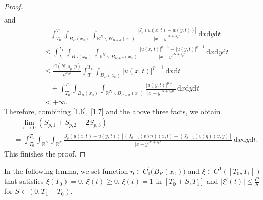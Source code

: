 \documentclass[reqno,10pt]{amsart}
\numberwithin{equation}{section}
\begin{document}
\begin{proof}
\begin{align*}
	\end{align*}
	and
	\begin{align*}
		&\quad\int_{T_0}^{T_1}\int_{B_R(x_0)}\int_{\mathbb{R}^N\backslash B_{R+d}(x_0)}\frac{\left| J_p\left(u(x,t)-u(y,t)\right)\right| }{|x-y|^{N+s_pp}}\,\mathrm{d}x\mathrm{d}y\mathrm{d}t\\
		&\le\int_{T_0}^{T_1}\int_{B_R(x_0)}\int_{\mathbb{R}^N\backslash B_{R+d}(x_0)}\frac{|u(x,t)|^{p-1}+|u(y,t)|^{p-1}}{|x-y|^{N+s_pp}}\,\mathrm{d}x\mathrm{d}y\mathrm{d}t\\
		&\le \frac{C(N,s_p,p)}{d^{s_pp}}\int_{T_0}^{T_1}\int_{B_R(x_0)}|u(x,t)|^{p-1}\,\mathrm{d}x\mathrm{d}t\\
		&\quad+\int_{T_0}^{T_1}\int_{B_R(x_0)}\int_{\mathbb{R}^N\backslash B_{R+d}(x_0)}\frac{|u(y,t)|^{p-1}}{|x-y|^{N+s_pp}}\,\mathrm{d}x\mathrm{d}y\mathrm{d}t\\
		&<+\infty.
	\end{align*}
	Therefore, combining \eqref{1.6}, \eqref{1.7} and the above three facts, we obtain
	\begin{align*}
		&\quad\lim\limits_{\varepsilon\rightarrow0}\left( S_{p,1}+S_{p,2}+2S_{p,3}\right)\\
		&=\int_{T_0}^{T_1}\int_{\mathbb{R}^N}\int_{\mathbb{R}^N}\frac{J_p\left( u(x,t)-u(y,t)\right)\left[ \left( J_{\delta+1}(v)\eta\right)(x,t)-\left( J_{\delta+1}(v)\eta\right)(x,y)\right] }{|x-y|^{N+s_pp}}\,\mathrm{d}x\mathrm{d}y\mathrm{d}t.
	\end{align*}
This finishes the proof.
\end{proof}

In the following lemma, we set function $\eta\in C^1_0\bigl(B_R(x_0)\bigl)$ and $\xi\in C^1\left( [T_0,T_1]\right)$ that satisfies $\xi(T_0)=0$, $\xi(t)\ge0$, $\xi(t)=1$ in $[T_0+S,T_1]$ and $|\xi'(t)|\le \frac{C}{S}$ for $S\in (0,T_1-T_0)$.
\end{document}
